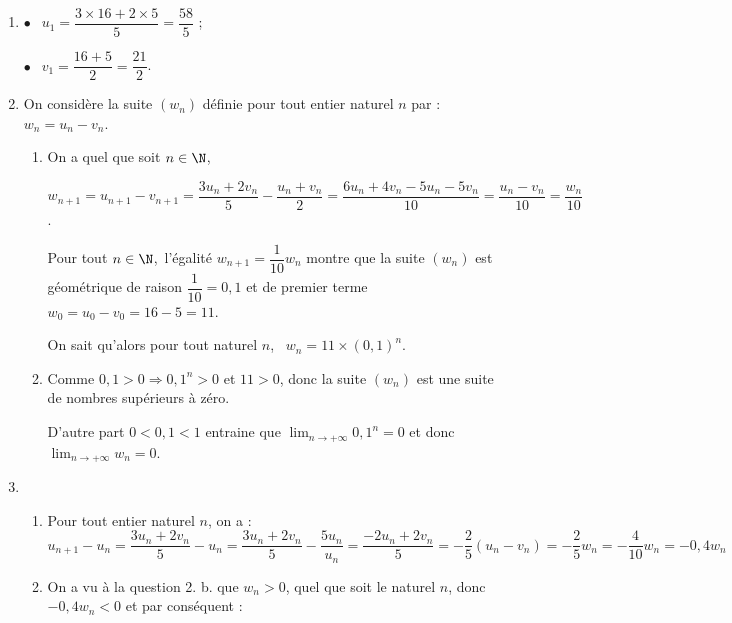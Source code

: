 \begin{enumerate}
\item %

$\bullet~~$ $u_1 = \dfrac{3\times 16 + 2 \times 5}{5} = \dfrac{58}{5}$ ;

$\bullet~~$ $v_1 = \dfrac{16 +5}{2} = \dfrac{21}{2}$.

\item On considère la suite $\left(w_n\right)$ définie pour tout entier naturel $n$ par : $w_n = u_n - v_n$.
	\begin{enumerate}
		\item %
		On a quel que soit $n \in \N$, 
		
		$w_{n+1} = u_{n+1} - v_{n+1} = \dfrac{3u_n + 2v_n}{5} - \dfrac{u_n + v_n}{2} = \dfrac{6u_n + 4v_n - 5u_n - 5v_n}{10} = \dfrac{u_n - v_n}{10} = \dfrac{w_n}{10}$.
		
Pour tout $n \in \N$,\, l'égalité $w_{n+1} = \dfrac{1}{10}w_n$ montre que la suite $\left(w_n\right)$ est géométrique de raison $\dfrac{1}{10} = 0,1$ et de premier terme $w_0 = u_0 - v_0 = 16 - 5 = 11$.
		
On sait qu'alors pour tout naturel $n$, \, $w_n = 11 \times (0,1)^n$.
		\item %
		Comme $0,1 > 0 \Rightarrow 0,1^n > 0$ et $11 > 0$, donc la suite $\left(w_n\right)$ est une suite de nombres supérieurs à zéro.
		
		D'autre part $0 < 0,1 < 1$ entraine que $\displaystyle\lim_{n \to + \infty} 0,1^n = 0$ et donc $\displaystyle\lim_{n \to + \infty} w_n = 0$.%
	\end{enumerate}
\item 
	\begin{enumerate}
		\item %
		Pour tout entier naturel $n$, on a : $u_{n+1} - u_n = \dfrac{3u_n + 2v_n}{5} - u_n =  \dfrac{3u_n + 2v_n}{5} - \dfrac{5u_n}{u_n} = \dfrac{- 2u_n + 2v_n}{5} = - \dfrac{2}{5}\left(u_n - v_n  \right) = - \dfrac{2}{5}w_n = - \dfrac{4}{10}w_n = - 0,4w_n$
		\item %
On a vu à la question 2. b. que $w_n > 0$, quel que soit le naturel $n$, donc $- 0,4w_n < 0$ et par conséquent :


\end{enumerate}
\end{enumerate}

